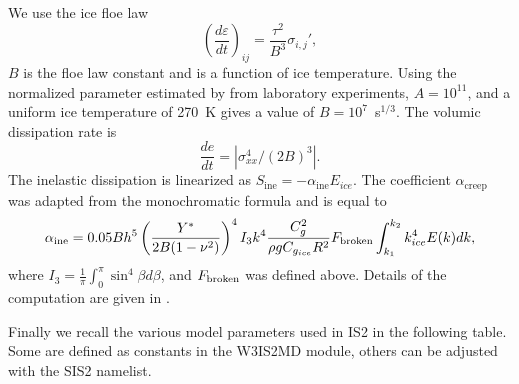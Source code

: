 We use the ice floe law
\begin{equation}
\left(\frac{d\varepsilon}{dt}\right)_{ij}=\frac{\tau^2}{B^3}\sigma_{i,j}',
\end{equation}
$B$ is the floe law  constant and is a function of ice temperature. Using the normalized parameter estimated by \cite{art:Cea98} from 
laboratory experiments, $A=10^{11}$,  and  a uniform ice temperature of 270~K  gives a value 
of $B=10^7$~s$^{1/3}$. The volumic dissipation rate is 
\begin{equation}
\frac{de}{dt}= | \sigma_{xx}^{4}/(2B)^3 |.
\end{equation}
The inelastic dissipation is linearized as  $S_{\mathrm{ine}}=-\alpha_{\mathrm{ine}} E_{ice}$. 
The coefficient $\alpha_{\mathrm{creep}}$ was adapted from the 
\cite{art:Wad73} monochromatic formula and is equal to
\begin{equation}
\alpha_{\mathrm{ine}}=0.05 B h^5 \left(\frac{Y^*}{2B(1-\nu^2)}\right)^{4} I_3 k^4 \frac{C_g^2}{\rho g C_{g_{ice}}R^2} F_{\rm broken} \int_{k_1}^{k_2} k_{ice}^4 E(k)dk, 
\label{eq:alpha_creep}
\end{equation}
where $I_3=\frac{1}{\pi} \int_0^\pi \sin^{4}\beta d\beta$, and $F_{\rm broken}$ was defined above.
 Details of the computation are given in \cite{art:Bea18}.

Finally we recall the various model parameters used in IS2 in the following table. Some are defined 
as constants in the {\code W3IS2MD} module, others can be adjusted with the {\F SIS2} namelist. 

